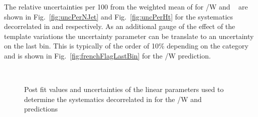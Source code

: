 The relative uncertainties per 100 \GeV from the weighted mean of \mht
for \ttbar/W and \zInv~ are shown in Fig.~\ref{fig:uncPerNJet}
and Fig.~\ref{fig:uncPerHt} for the systematics decorrelated in
\njet and \scalht respectively. As an additional gauge of the 
effect of the template variations the uncertainty parameter 
can be translate to an uncertainty on the last bin. This is typically
of the order of 10\% depending on the category and is shown
in Fig.~\ref{fig:frenchFlagLastBin} for the \ttbar/W prediction.

\begin{figure}[h!]
  \centering
  ~~
  \\
  \caption{\label{fig:postFitPerNJet} 
  Post fit values and uncertainties of the linear parameters used to determine the systematics decorrelated in \njet for 
  the \ttbar/W and \zInv~ predictions}
\end{figure}
